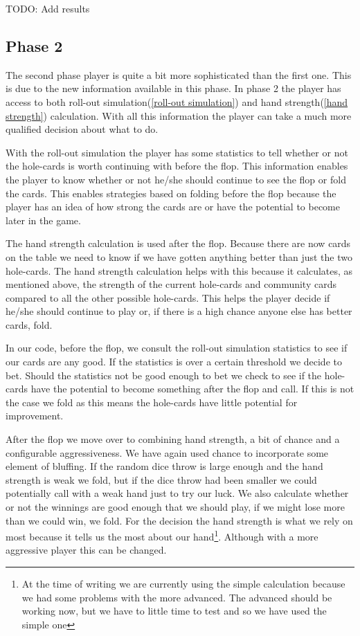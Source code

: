 \documentclass[titlepage, a4paper]{article}
\begin{document}
TODO: Add results

\subsection{Phase 2}\label{phase 2 player}
The second phase player is quite a bit more sophisticated than the first one. This
is due to the new information available in this phase. In phase 2 the player has
access to both roll-out simulation(\ref{roll-out simulation}) and hand 
strength(\ref{hand strength}) calculation. With all this information the player
can take a much more qualified decision about what to do. 

With the roll-out simulation
the player has some statistics to tell whether or not the hole-cards is worth
continuing with before the flop. This information enables the player to know
whether or not he/she should continue to see the flop or fold the cards. This
enables strategies based on folding before the flop because the player has
an idea of how strong the cards are or have the potential to become later
in the game. 

The hand strength calculation is used after the flop. Because there are now cards
on the table we need to know if we have gotten anything better than just the two
hole-cards. The hand strength calculation helps with this because it calculates,
as mentioned above, the strength of the current hole-cards and community cards
compared to all the other possible hole-cards. This helps the player decide if
he/she should continue to play or, if there is a high chance anyone else has better
cards, fold.

In our code, before the flop, we consult the roll-out simulation statistics to see
if our cards are any good. If the statistics is over a certain threshold we decide
to bet. Should the statistics not be good enough to bet we check to see if the
hole-cards have the potential to become something after the flop and call. If this
is not the case we fold as this means the hole-cards have little potential for improvement.

After the flop we move over to combining hand strength, a bit of chance and a
configurable aggressiveness. We have again used chance to incorporate some element
of bluffing. If the random dice throw is large enough and the hand strength is weak
we fold, but if the dice throw had been smaller we could potentially call with a weak
hand just to try our luck. We also calculate whether or not the winnings are good
enough that we should play, if we might lose more than we could win, we fold.
For the decision the hand strength is what we rely on most because it tells us the
most about our hand\footnote{At the time of writing we are currently using the
	simple calculation because we had some problems with the more advanced.
	The advanced should be working now, but we have to little time to test
and so we have used the simple one}. Although with a more aggressive player this
can be changed.
\end{document}
